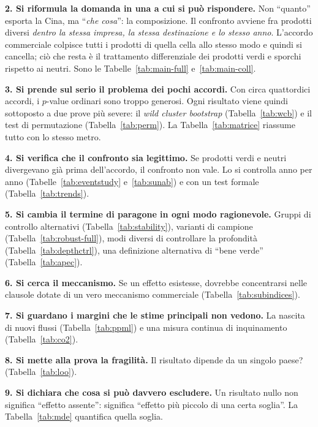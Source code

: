 \documentclass[11pt,a4paper]{article}
\begin{document}
\textbf{2. Si riformula la domanda in una a cui si pu\`o rispondere.} Non ``quanto''
esporta la Cina, ma ``\emph{che cosa}'': la composizione. Il confronto avviene fra prodotti
diversi \emph{dentro la stessa impresa, la stessa destinazione e lo stesso anno}. L'accordo
commerciale colpisce tutti i prodotti di quella cella allo stesso modo e quindi si
cancella; ci\`o che resta \`e il trattamento differenziale dei prodotti verdi e sporchi
rispetto ai neutri. Sono le Tabelle~\ref{tab:main-full} e~\ref{tab:main-coll}.

\textbf{3. Si prende sul serio il problema dei pochi accordi.} Con circa quattordici
accordi, i $p$-value ordinari sono troppo generosi. Ogni risultato viene quindi sottoposto
a due prove pi\`u severe: il \emph{wild cluster bootstrap} (Tabella~\ref{tab:wcb}) e il
test di permutazione (Tabella~\ref{tab:perm}). La Tabella~\ref{tab:matrice} riassume tutto
con lo stesso metro.

\textbf{4. Si verifica che il confronto sia legittimo.} Se prodotti verdi e neutri
divergevano gi\`a prima dell'accordo, il confronto non vale. Lo si controlla anno per anno
(Tabelle~\ref{tab:eventstudy} e~\ref{tab:sunab}) e con un test formale
(Tabella~\ref{tab:trends}).

\textbf{5. Si cambia il termine di paragone in ogni modo ragionevole.} Gruppi di controllo
alternativi (Tabella~\ref{tab:stability}), varianti di campione
(Tabella~\ref{tab:robust-full}), modi diversi di controllare la profondit\`a
(Tabella~\ref{tab:depthctrl}), una definizione alternativa di ``bene verde''
(Tabella~\ref{tab:apec}).

\textbf{6. Si cerca il meccanismo.} Se un effetto esistesse, dovrebbe concentrarsi nelle
clausole dotate di un vero meccanismo commerciale (Tabella~\ref{tab:subindices}).

\textbf{7. Si guardano i margini che le stime principali non vedono.} La nascita di nuovi
flussi (Tabella~\ref{tab:ppml}) e una misura continua di inquinamento
(Tabella~\ref{tab:co2}).

\textbf{8. Si mette alla prova la fragilit\`a.} Il risultato dipende da un singolo paese?
(Tabella~\ref{tab:loo}).

\textbf{9. Si dichiara che cosa si pu\`o davvero escludere.} Un risultato nullo non
significa ``effetto assente'': significa ``effetto pi\`u piccolo di una certa soglia''.
La Tabella~\ref{tab:mde} quantifica quella soglia.

\newpage
\end{document}
